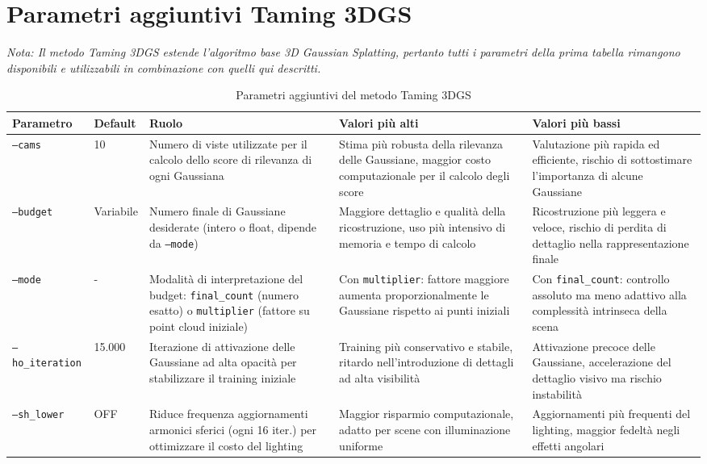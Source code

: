\section{Parametri aggiuntivi Taming 3DGS}\label{app:taming}
\begin{sidewaystable}
	\centering
	\footnotesize
	\textit{Nota: Il metodo Taming 3DGS estende l'algoritmo base 3D Gaussian Splatting, pertanto tutti i parametri della prima tabella rimangono disponibili e utilizzabili in combinazione con quelli qui descritti.}
	\vspace{0.3cm}
	\begin{tabular}{|p{3cm}|p{2cm}|p{4.5cm}|p{4cm}|p{3.5cm}|}
		\hline
		\textbf{Parametro} & \textbf{Default} & \textbf{Ruolo} & \textbf{Valori più alti} & \textbf{Valori più bassi} \\ 
		\hline
		\texttt{--cams} & 10 & Numero di viste utilizzate per il calcolo dello score di rilevanza di ogni Gaussiana & Stima più robusta della rilevanza delle Gaussiane, maggior costo computazionale per il calcolo degli score & Valutazione più rapida ed efficiente, rischio di sottostimare l'importanza di alcune Gaussiane \\
		\hline
		\texttt{--budget} & Variabile & Numero finale di Gaussiane desiderate (intero o float, dipende da \texttt{--mode}) & Maggiore dettaglio e qualità della ricostruzione, uso più intensivo di memoria e tempo di calcolo & Ricostruzione più leggera e veloce, rischio di perdita di dettaglio nella rappresentazione finale \\
		\hline
		\texttt{--mode} & - & Modalità di interpretazione del budget: \texttt{final\_count} (numero esatto) o \texttt{multiplier} (fattore su point cloud iniziale) & Con \texttt{multiplier}: fattore maggiore aumenta proporzionalmente le Gaussiane rispetto ai punti iniziali & Con \texttt{final\_count}: controllo assoluto ma meno adattivo alla complessità intrinseca della scena \\
		\hline
		\texttt{--ho\_iteration} & 15.000 & Iterazione di attivazione delle Gaussiane ad alta opacità per stabilizzare il training iniziale & Training più conservativo e stabile, ritardo nell'introduzione di dettagli ad alta visibilità & Attivazione precoce delle Gaussiane, accelerazione del dettaglio visivo ma rischio instabilità \\
		\hline
		\texttt{--sh\_lower} & OFF & Riduce frequenza aggiornamenti armonici sferici (ogni 16 iter.) per ottimizzare il costo del lighting & Maggior risparmio computazionale, adatto per scene con illuminazione uniforme & Aggiornamenti più frequenti del lighting, maggior fedeltà negli effetti angolari \\
		\hline
	\end{tabular}
	\caption{Parametri aggiuntivi del metodo Taming 3DGS}
	\label{tab:taming_params}
\end{sidewaystable}


